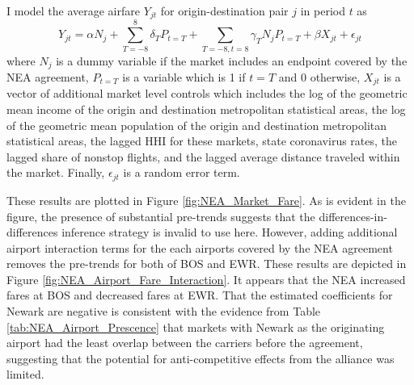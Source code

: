 \documentclass{article}
\begin{document}
    I model the average airfare $Y_{jt}$ for origin-destination pair $j$ in period $t$ as \[Y_{jt} = \alpha N_{j} + \sum_{T = -8}^{8} \delta_{T} P_{t = T} + \sum_{T = -8, t = 8} \gamma_{T} N_{j} P_{t = T} + \beta X_{jt} + \epsilon_{jt}\] where $N_{j}$ is a dummy variable if the market includes an endpoint covered by the NEA agreement, $P_{t = T}$ is a variable which is 1 if $t = T$ and 0 otherwise, $X_{jt}$ is a vector of additional market level controls which includes the log of the geometric mean income of the origin and destination metropolitan statistical areas, the log of the geometric mean population of the origin and destination metropolitan statistical areas, the lagged HHI for these markets, state coronavirus rates, the lagged share of nonstop flights, and the lagged average distance traveled within the market. Finally, $\epsilon_{jt}$ is a random error term. 

    These results are plotted in Figure \ref{fig:NEA_Market_Fare}. As is evident in the figure, the presence of substantial pre-trends suggests that the differences-in-differences inference strategy is invalid to use here. However, adding additional airport interaction terms for the each airports covered by the NEA agreement removes the pre-trends for both of BOS and EWR. These results are depicted in Figure \ref{fig:NEA_Airport_Fare_Interaction}. It appears that the NEA increased fares at BOS and decreased fares at EWR. That the estimated coefficients for Newark are negative is consistent with the evidence from Table \ref{tab:NEA_Airport_Prescence} that markets with Newark as the originating airport had the least overlap between the carriers before the agreement, suggesting that the potential for anti-competitive effects from the alliance was limited. 
\end{document}
